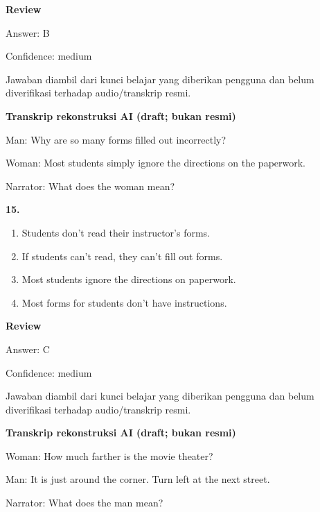 \documentclass[12pt]{article}
\begin{document}
\par
\begingroup
\setlength{\parskip}{0pt}
\setlength{\parindent}{0pt}
\textbf{Review}\par
Answer: B\par
Confidence: medium\par
Jawaban diambil dari kunci belajar yang diberikan pengguna dan belum diverifikasi terhadap audio/transkrip resmi.\par
\endgroup
\par
\vspace{0.25\baselineskip}
\begin{exampleblock}
\textbf{Transkrip rekonstruksi AI (draft; bukan resmi)}\par
Man: Why are so many forms filled out incorrectly?\par
Woman: Most students simply ignore the directions on the paperwork.\par
Narrator: What does the woman mean?\par
\end{exampleblock}
\noindent\textbf{15.}
\begin{enumerate}[label=(\Alph*),leftmargin=*,itemsep=0.2em]
\item Students don't read their instructor's forms.
\item If students can't read, they can't fill out forms.
\item Most students ignore the directions on paperwork.
\item Most forms for students don't have instructions.
\end{enumerate}
\par
\begingroup
\setlength{\parskip}{0pt}
\setlength{\parindent}{0pt}
\textbf{Review}\par
Answer: C\par
Confidence: medium\par
Jawaban diambil dari kunci belajar yang diberikan pengguna dan belum diverifikasi terhadap audio/transkrip resmi.\par
\endgroup
\par
\vspace{0.25\baselineskip}
\begin{exampleblock}
\textbf{Transkrip rekonstruksi AI (draft; bukan resmi)}\par
Woman: How much farther is the movie theater?\par
Man: It is just around the corner. Turn left at the next street.\par
Narrator: What does the man mean?\par
\end{exampleblock}
\end{document}
